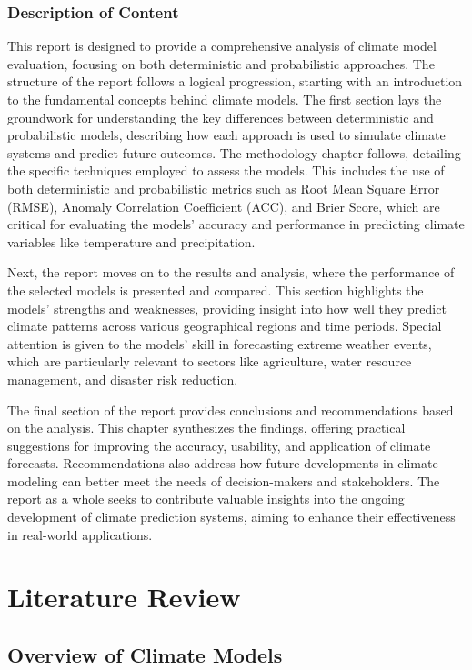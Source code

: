 \subsection{Description of Content}

This report is designed to provide a comprehensive analysis of climate model evaluation, focusing on both deterministic and probabilistic approaches. The structure of the report follows a logical progression, starting with an introduction to the fundamental concepts behind climate models. The first section lays the groundwork for understanding the key differences between deterministic and probabilistic models, describing how each approach is used to simulate climate systems and predict future outcomes. The methodology chapter follows, detailing the specific techniques employed to assess the models. This includes the use of both deterministic and probabilistic metrics such as Root Mean Square Error (RMSE), Anomaly Correlation Coefficient (ACC), and Brier Score, which are critical for evaluating the models' accuracy and performance in predicting climate variables like temperature and precipitation.

Next, the report moves on to the results and analysis, where the performance of the selected models is presented and compared. This section highlights the models' strengths and weaknesses, providing insight into how well they predict climate patterns across various geographical regions and time periods. Special attention is given to the models' skill in forecasting extreme weather events, which are particularly relevant to sectors like agriculture, water resource management, and disaster risk reduction.

The final section of the report provides conclusions and recommendations based on the analysis. This chapter synthesizes the findings, offering practical suggestions for improving the accuracy, usability, and application of climate forecasts. Recommendations also address how future developments in climate modeling can better meet the needs of decision-makers and stakeholders. The report as a whole seeks to contribute valuable insights into the ongoing development of climate prediction systems, aiming to enhance their effectiveness in real-world applications.


\chapter{Literature Review}
\section{Overview of Climate Models}
